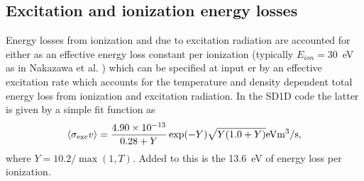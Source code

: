 \documentclass[amsmath,amssymb,a4]{revtex4-2}
\begin{document}
\subsection{Excitation and ionization energy losses}

Energy losses from ionization and due to excitation radiation are accounted for either as an effective energy loss constant per ionization (typically $E_{ion} = 30$~eV as in Nakazawa et al. \cite{nakazawa2000}) which can be specified at input er by an effective excitation rate which accounts for the temperature and density dependent total energy loss from ionization and excitation radiation. In the SD1D code the latter is given by a simple fit function as
\begin{equation}\label{excitation_SD1D}
    \langle\sigma_{\rm exc} v\rangle = {4.90 \times 10^{-13} \over 0.28 + Y} \exp(-Y) \sqrt{Y (1.0 + Y)} {\rm eV} {\rm m}^3/{\rm s},
\end{equation}
where $Y = 10.2 / \max( 1, T)$. Added to this is the 13.6~eV of energy loss per ionization.
\end{document}
